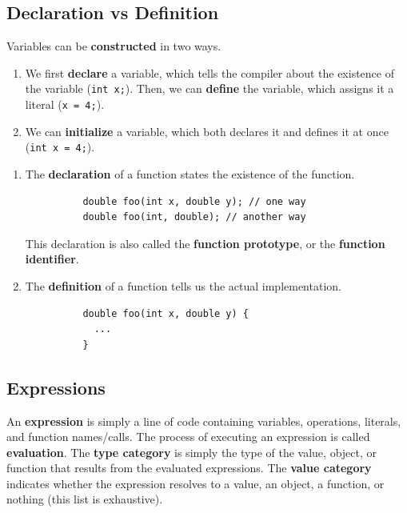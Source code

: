 \documentclass{article}
\newcounter{definition}[section]
\newcounter{code}[section]
\begin{document}
  \subsection{Declaration vs Definition} 

    Variables can be \textbf{constructed} in two ways. 
    \begin{enumerate}
      \item We first \textbf{declare} a variable, which tells the compiler about the existence of the variable (\texttt{int x;}). Then, we can \textbf{define} the variable, which assigns it a literal (\texttt{x = 4;}). 
      \item We can \textbf{initialize} a variable, which both declares it and defines it at once (\texttt{int x = 4;}).
    \end{enumerate}

    \begin{enumerate}
      \item The \textbf{declaration} of a function states the existence of the function. 
        \begin{lstlisting}
          double foo(int x, double y); // one way 
          double foo(int, double); // another way 
        \end{lstlisting}
        This declaration is also called the \textbf{function prototype}, or the \textbf{function identifier}. 

      \item The \textbf{definition} of a function tells us the actual implementation. 
        \begin{lstlisting}
          double foo(int x, double y) {
            ...
          }
        \end{lstlisting}
    \end{enumerate}

  \subsection{Expressions}

    \begin{definition}[Expression]
      \label{def:expression}
      An \textbf{expression} is simply a line of code containing variables, operations, literals, and function names/calls. The process of executing an expression is called \textbf{evaluation}. The \textbf{type category} is simply the type of the value, object, or function that results from the evaluated expressions. The \textbf{value category} indicates whether the expression resolves to a value, an object, a function, or nothing (this list is exhaustive). 
    \end{definition}
\end{document}
